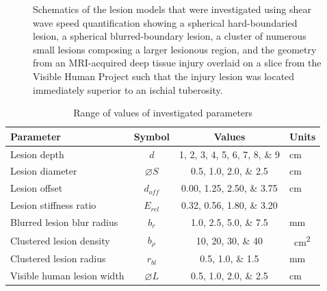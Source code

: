 \begin{figure}[!htb]
{
					\label{fig:shear_schematic_human}
				}
				\caption[Schematic of shear wave speed quantification-investigated lesions]{Schematics of the lesion models that were investigated using shear wave speed quantification showing \protect{} a spherical hard-boundaried lesion, \protect{} a spherical blurred-boundary lesion, \protect{} a cluster of numerous small lesions composing a larger lesionous region, and \protect{} the geometry from an MRI-acquired deep tissue injury overlaid on a slice from the Visible Human Project such that the injury lesion was located immediately superior to an ischial tuberosity.}	
				\label{fig:shear_schematics}
			\end{figure}

			\begin{table}[!htb]
				\centering
				\caption[Shear wave speed quantification model investigated parameters]{Range of values of investigated parameters}
				\label{tab:shear-parametervalues}
				\begin{tabular}{lccs[table-unit-alignment = left]}
					\toprule
					Parameter & Symbol & Values & Units \\
					\midrule
					Lesion depth & $d$ & \numlist{1;2;3;4;5;6;7;8;9} & \si{\cm} \\
					Lesion diameter & $\diameter S$ & \numlist{0.5;1.0;2.0;2.5} & \si{\cm} \\
					Lesion offset & $d_{off}$ & \numlist{0.00;1.25;2.50;3.75} & \si{\cm} \\
					Lesion stiffness ratio & $E_{rel}$ & \numlist{0.32;0.56;1.80;3.20} & \\
					Blurred lesion blur radius & $b_r$ & \numlist{1.0;2.5;5.0;7.5} & \si{\mm} \\
					Clustered lesion density & $b_\rho$ & \numlist{10;20;30;40} & \si{\per\cm\squared} \\
					Clustered lesion radius & $r_{bl}$ & \numlist{0.5;1.0;1.5} & \si{\mm} \\
					Visible human lesion width & $\diameter L$ & \numlist{0.5;1.0;2.0;2.5} & \si{\cm} \\
					\bottomrule
				\end{tabular}
			\end{table}

